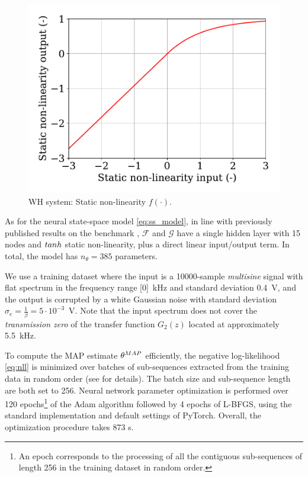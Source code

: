 \documentclass{ifacconf}
\newcommand{\MAP}{{\rm MAP}}
\begin{document}
\begin{figure}
 \centering
 \includegraphics[width=.7\linewidth]{img/wh_static.pdf}
 \caption{WH system: Static non-linearity $f(\cdot)$.}
 \label{fig:wh_static}
\end{figure}

As for the neural state-space model \eqref{eq:ss_model}, in line with previously published results on the benchmark \cite{beintema2021nonlinear}, $\mathcal{F}$ and $\mathcal{G}$ have a single hidden layer with 15 nodes and $\rm tanh$ static non-linearity, plus a direct linear input/output term. In total, the model has $n_\theta=385$ parameters.

We use a training dataset where the input is a 10000-sample \emph{multisine} signal with flat spectrum 
in the frequency range [0]~kHz and standard deviation 0.4~V, and the output is corrupted by a white Gaussian noise with standard deviation $\sigma_e=\frac{1}{\beta}=5 \cdot 10^{-3}$~V. Note that the input spectrum does not cover the \emph{transmission zero} of the transfer function $G_2(z)$ located at approximately 5.5~kHz.

To compute the MAP estimate $\theta^\MAP$ efficiently, the negative log-likelihood \eqref{eq:nll} is minimized over batches of sub-sequences extracted from the training data in random order (see \cite{forgione2020model} for details). The batch size and sub-sequence length are both set to 256. 
Neural network parameter optimization is performed over 120 epochs\footnote{An epoch corresponds to the processing of all the contiguous sub-sequences of length 256 in the training dataset in random order.} of the Adam algorithm followed by 4 epochs of L-BFGS, using the standard implementation and default settings of PyTorch. Overall, the optimization procedure takes 873 s.
\end{document}
